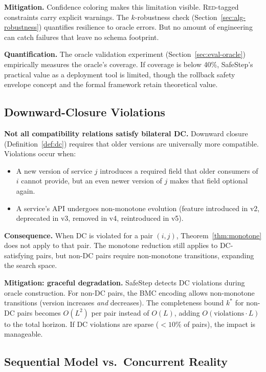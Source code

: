 \documentclass[10pt,twocolumn]{article}
\begin{document}
\textbf{Mitigation.} Confidence coloring makes this limitation visible. \textsc{Red}-tagged constraints carry explicit warnings. The $k$-robustness check (Section~\ref{sec:alg-robustness}) quantifies resilience to oracle errors. But no amount of engineering can catch failures that leave no schema footprint.

\textbf{Quantification.} The oracle validation experiment (Section~\ref{sec:eval-oracle}) empirically measures the oracle's coverage. If coverage is below 40\%, SafeStep's practical value as a deployment tool is limited, though the rollback safety envelope concept and the formal framework retain theoretical value.

\subsection{Downward-Closure Violations}
\label{sec:limit-dc}

\textbf{Not all compatibility relations satisfy bilateral DC.} Downward closure (Definition~\ref{def:dc}) requires that older versions are universally more compatible. Violations occur when:
\begin{itemize}
\item A new version of service $j$ introduces a required field that older consumers of $i$ cannot provide, but an even newer version of $j$ makes that field optional again.
\item A service's API undergoes non-monotone evolution (feature introduced in v2, deprecated in v3, removed in v4, reintroduced in v5).
\end{itemize}

\textbf{Consequence.} When DC is violated for a pair $(i,j)$, Theorem~\ref{thm:monotone} does not apply to that pair. The monotone reduction still applies to DC-satisfying pairs, but non-DC pairs require non-monotone transitions, expanding the search space.

\textbf{Mitigation: graceful degradation.} SafeStep detects DC violations during oracle construction. For non-DC pairs, the BMC encoding allows non-monotone transitions (version increases \emph{and} decreases). The completeness bound $k^*$ for non-DC pairs becomes $O(L^2)$ per pair instead of $O(L)$, adding $O(\text{violations} \cdot L)$ to the total horizon. If DC violations are sparse ($< 10\%$ of pairs), the impact is manageable.

\subsection{Sequential Model vs.\ Concurrent Reality}
\label{sec:limit-sequential}
\end{document}
